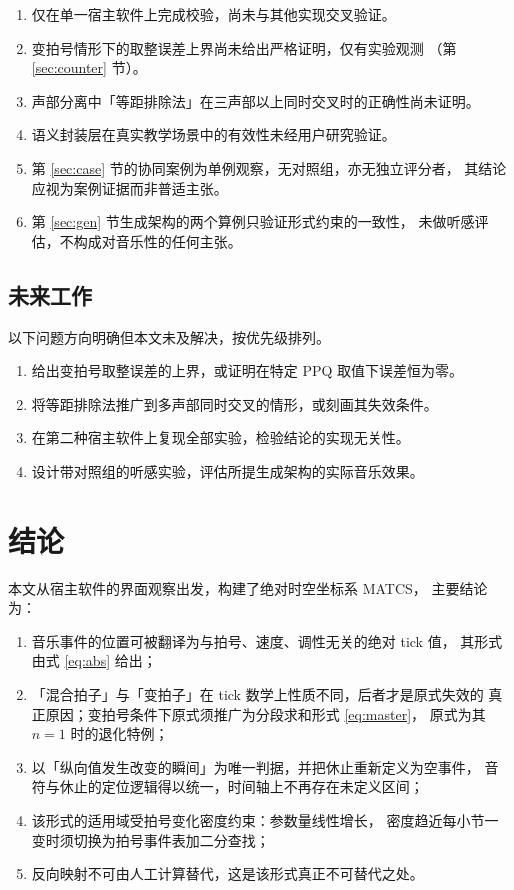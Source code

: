 \documentclass[11pt,a4paper,fontset=none]{ctexart}
\begin{document}
\begin{enumerate}[leftmargin=2.2em,itemsep=0.15em,topsep=0.2em]
  \item 仅在单一宿主软件上完成校验，尚未与其他实现交叉验证。
  \item 变拍号情形下的取整误差上界尚未给出严格证明，仅有实验观测
        （第 \ref{sec:counter} 节）。
  \item 声部分离中「等距排除法」在三声部以上同时交叉时的正确性尚未证明。
  \item 语义封装层在真实教学场景中的有效性未经用户研究验证。
  \item 第 \ref{sec:case} 节的协同案例为单例观察，无对照组，亦无独立评分者，
        其结论应视为案例证据而非普适主张。
  \item 第 \ref{sec:gen} 节生成架构的两个算例只验证形式约束的一致性，
        未做听感评估，不构成对音乐性的任何主张。
\end{enumerate}

\subsection{未来工作}

以下问题方向明确但本文未及解决，按优先级排列。

\begin{enumerate}[leftmargin=2.2em,itemsep=0.15em,topsep=0.2em]
  \item 给出变拍号取整误差的上界，或证明在特定 PPQ 取值下误差恒为零。
  \item 将等距排除法推广到多声部同时交叉的情形，或刻画其失效条件。
  \item 在第二种宿主软件上复现全部实验，检验结论的实现无关性。
  \item 设计带对照组的听感实验，评估所提生成架构的实际音乐效果。
\end{enumerate}

\section{结论}
本文从宿主软件的界面观察出发，构建了绝对时空坐标系 MATCS，
主要结论为：

\begin{enumerate}[leftmargin=2.2em,itemsep=0.15em,topsep=0.2em]
  \item 音乐事件的位置可被翻译为与拍号、速度、调性无关的绝对 tick 值，
        其形式由式 \eqref{eq:abs} 给出；
  \item 「混合拍子」与「变拍子」在 tick 数学上性质不同，后者才是原式失效的
        真正原因；变拍号条件下原式须推广为分段求和形式 \eqref{eq:master}，
        原式为其 $n=1$ 时的退化特例；
  \item 以「纵向值发生改变的瞬间」为唯一判据，并把休止重新定义为空事件，
        音符与休止的定位逻辑得以统一，时间轴上不再存在未定义区间；
  \item 该形式的适用域受拍号变化密度约束：参数量线性增长，
        密度趋近每小节一变时须切换为拍号事件表加二分查找；
  \item 反向映射不可由人工计算替代，这是该形式真正不可替代之处。
\end{enumerate}
\end{document}

